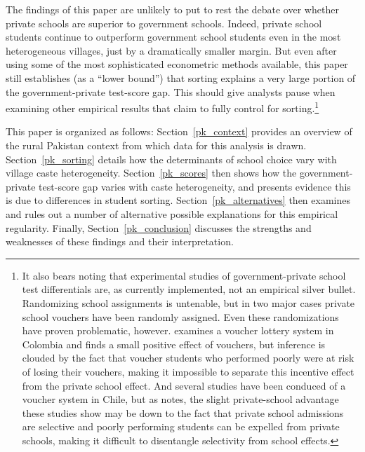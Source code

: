 \documentclass[Eubank_pk_ethnic_sorting.tex]{subfiles}
\begin{document}
The findings of this paper are unlikely to put to rest the debate over whether private schools are superior to government schools. Indeed, private school students continue to outperform government school students even in the most heterogeneous villages, just by a dramatically smaller margin. But even after using some of the most sophisticated econometric methods available, this paper still establishes (as a  ``lower bound'') that sorting explains a very large portion of the government-private test-score gap. This should give analysts pause when examining other empirical results that claim to fully control for sorting.\footnote{It also bears noting that experimental studies of government-private school test differentials are, as currently implemented, not an empirical silver bullet. Randomizing school assignments is untenable, but in two major cases private school vouchers have been randomly assigned. Even these randomizations have proven problematic, however. \cite{Angrist:2002up} examines a voucher lottery system in Colombia and finds a small positive effect of vouchers, but inference is clouded by the fact that voucher students who performed poorly were at risk of losing their vouchers, making it impossible to separate this incentive effect from the private school effect. And several studies have been conduced of a voucher system in Chile, but as \cite{Bellei:2008uu} notes, the slight private-school advantage these studies show may be down to the fact that private school admissions are selective and poorly performing students can be expelled from private schools, making it difficult to disentangle selectivity from school effects.}

This paper is organized as follows: Section~\ref{pk_context} provides an overview of the rural Pakistan context from which data for this analysis is drawn. Section~\ref{pk_sorting} details how the determinants of school choice vary with village caste heterogeneity. Section~\ref{pk_scores} then shows how the government-private test-score gap varies with caste heterogeneity, and presents evidence this is due to differences in student sorting. Section~\ref{pk_alternatives} then examines and rules out a number of alternative possible explanations for this empirical regularity. Finally, Section~\ref{pk_conclusion} discusses the strengths and weaknesses of these findings and their interpretation. 
\end{document}

